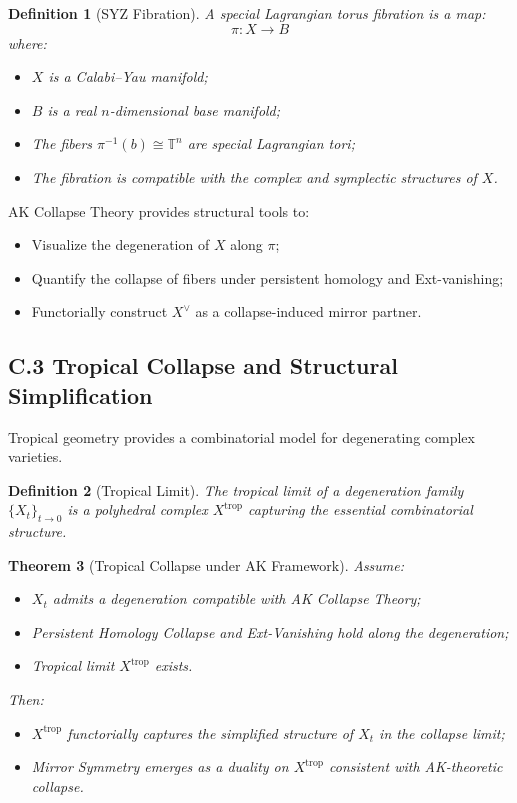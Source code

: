 \documentclass[11pt]{article}
\newtheorem{theorem}{Theorem}[section]
\newtheorem{definition}[theorem]{Definition}
\begin{document}
\begin{definition}[SYZ Fibration]
A special Lagrangian torus fibration is a map:
\[
\pi: X \longrightarrow B
\]
where:

\begin{itemize}
    \item $X$ is a Calabi--Yau manifold;
    \item $B$ is a real $n$-dimensional base manifold;
    \item The fibers $\pi^{-1}(b) \cong \mathbb{T}^n$ are special Lagrangian tori;
    \item The fibration is compatible with the complex and symplectic structures of $X$.
\end{itemize}
\end{definition}

AK Collapse Theory provides structural tools to:

\begin{itemize}
    \item Visualize the degeneration of $X$ along $\pi$;
    \item Quantify the collapse of fibers under persistent homology and Ext-vanishing;
    \item Functorially construct $X^\vee$ as a collapse-induced mirror partner.
\end{itemize}

\subsection*{C.3 Tropical Collapse and Structural Simplification}

Tropical geometry provides a combinatorial model for degenerating complex varieties.

\begin{definition}[Tropical Limit]
The tropical limit of a degeneration family $\{X_t\}_{t \to 0}$ is a polyhedral complex $X^{\mathrm{trop}}$ capturing the essential combinatorial structure.
\end{definition}

\begin{theorem}[Tropical Collapse under AK Framework]
Assume:

\begin{itemize}
    \item $X_t$ admits a degeneration compatible with AK Collapse Theory;
    \item Persistent Homology Collapse and Ext-Vanishing hold along the degeneration;
    \item Tropical limit $X^{\mathrm{trop}}$ exists.
\end{itemize}

Then:

\begin{itemize}
    \item $X^{\mathrm{trop}}$ functorially captures the simplified structure of $X_t$ in the collapse limit;
    \item Mirror Symmetry emerges as a duality on $X^{\mathrm{trop}}$ consistent with AK-theoretic collapse.
\end{itemize}
\end{theorem}
\end{document}

